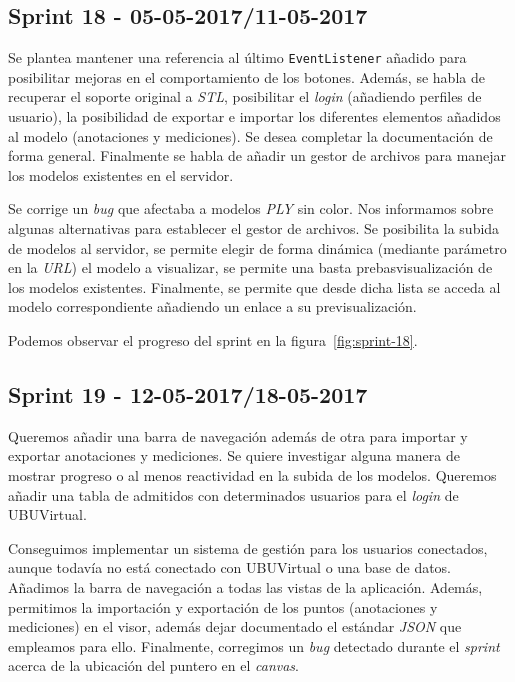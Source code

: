 \subsection{Sprint 18 - 05-05-2017/11-05-2017}
Se plantea mantener una referencia al último \texttt{EventListener} añadido para posibilitar mejoras en el comportamiento de los botones. Además, se habla de recuperar el soporte original a \textit{STL}, posibilitar el \textit{login} (añadiendo perfiles de usuario), la posibilidad de exportar e importar los diferentes elementos añadidos al modelo (anotaciones y mediciones). Se desea completar la documentación de forma general. Finalmente se habla de añadir un gestor de archivos para manejar los modelos existentes en el servidor.

Se corrige un \textit{bug} que afectaba a modelos \textit{PLY} sin color. Nos informamos sobre algunas alternativas para establecer el gestor de archivos. Se posibilita la subida de modelos al servidor, se permite elegir de forma dinámica (mediante parámetro en la \textit{URL}) el modelo a visualizar, se permite una basta prebasvisualización de los modelos existentes. Finalmente, se permite que desde dicha lista se acceda al modelo correspondiente añadiendo un enlace a su previsualización.

Podemos observar el progreso del sprint en la figura~\ref{fig:sprint-18}.

\subsection{Sprint 19 - 12-05-2017/18-05-2017}
Queremos añadir una barra de navegación además de otra para importar y exportar anotaciones y mediciones. Se quiere investigar alguna manera de mostrar progreso o al menos reactividad en la subida de los modelos. Queremos añadir una tabla de admitidos con determinados usuarios para el \textit{login} de UBUVirtual. 

Conseguimos implementar un sistema de gestión para los usuarios conectados, aunque todavía no está conectado con UBUVirtual o una base de datos. Añadimos la barra de navegación a todas las vistas de la aplicación. Además, permitimos la importación y exportación de los puntos (anotaciones y mediciones) en el visor, además dejar documentado el estándar \textit{JSON} que empleamos para ello. Finalmente, corregimos un \textit{bug} detectado durante el \textit{sprint} acerca de la ubicación del puntero en el \textit{canvas}.

